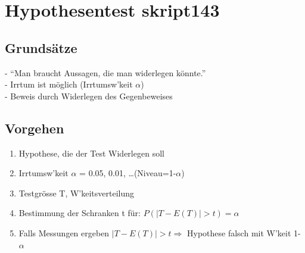 \section{Hypothesentest skript{143} }
	\subsection{Grundsätze}
	- ``Man braucht Aussagen, die man widerlegen könnte.''\\
	- Irrtum ist möglich (Irrtumsw'keit $\alpha$)\\
	- Beweis durch Widerlegen des Gegenbeweises
	\subsection{Vorgehen}
	\begin{enumerate}
      \item Hypothese, die der Test Widerlegen soll
      \item Irrtumsw'keit $\alpha$ = 0.05, 0.01, \ldots (Niveau=1-$\alpha$)
      \item Testgrösse T, W'keitsverteilung
      \item Bestimmung der Schranken t für: $P(|T-E(T)|>t)=\alpha$
      \item Falls Messungen ergeben $|T-E(T)|>t \Longrightarrow$ Hypothese
      falsch mit W'keit 1- $\alpha$
    \end{enumerate}
    
    
